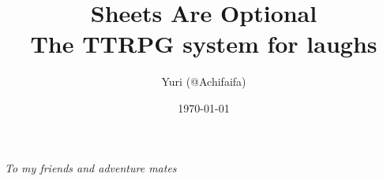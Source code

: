 \documentclass{book}
\title{Sheets Are Optional\\
\large The TTRPG system for laughs}
\author{Yuri (@Achifaifa)}
\date{\today}
\begin{document}
\maketitle
\vspace*{\fill}
\hfill
\begin{center}
\textit{To my friends and adventure mates}
\end{center}
\vspace{\fill}
\tableofcontents


\setcounter{page}{1}




\appendix

\pagebreak

\pagebreak

\pagebreak
\end{document}
